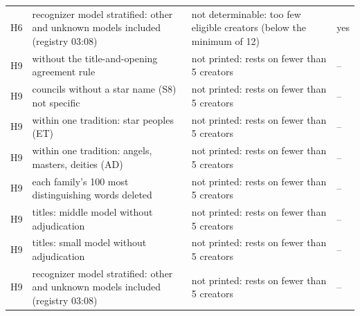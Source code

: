 {\begin{tabular}{@{}lp{}p{}l@{}}
H6 & recognizer model stratified: other and unknown models included (registry 03:08) & not determinable: too few eligible creators (below the minimum of 12) & yes \\
H9 & without the title-and-opening agreement rule & not printed: rests on fewer than 5 creators & -- \\
H9 & councils without a star name (S8) not specific & not printed: rests on fewer than 5 creators & -- \\
H9 & within one tradition: star peoples (ET) & not printed: rests on fewer than 5 creators & -- \\
H9 & within one tradition: angels, masters, deities (AD) & not printed: rests on fewer than 5 creators & -- \\
H9 & each family's 100 most distinguishing words deleted & not printed: rests on fewer than 5 creators & -- \\
H9 & titles: middle model without adjudication & not printed: rests on fewer than 5 creators & -- \\
H9 & titles: small model without adjudication & not printed: rests on fewer than 5 creators & -- \\
H9 & recognizer model stratified: other and unknown models included (registry 03:08) & not printed: rests on fewer than 5 creators & -- \\
\bottomrule
\end{tabular}}

